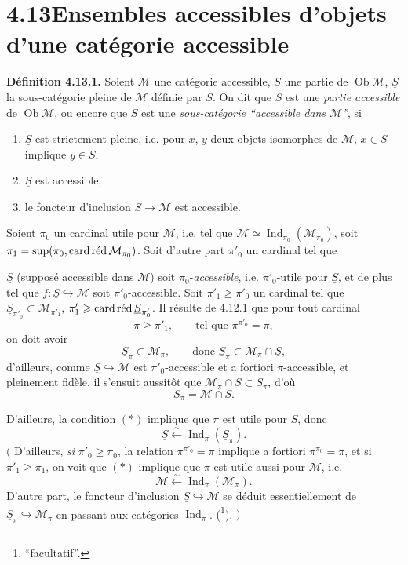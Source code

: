 \documentclass[11pt]{article}
\newcommand{\printedpage}[1]{\marginpar{\footnotesize p.~#1}}
\newcommand{\msp}[1]{\marginpar{\footnotesize [#1]}}
\newcommand{\M}{\mathcal{M}}
\newcommand{\Ind}{\operatorname{Ind}}
\newcommand{\Ob}{\operatorname{Ob}}
\newcommand{\card}{\operatorname{card}}
\newcommand{\red}{\mathop{\textup{réd}}\nolimits}
\newcommand{\uS}{\underline{S}}
\begin{document}
\msp{page 281}

\section*{4.13\quad Ensembles accessibles d'objets d'une catégorie accessible}

\textbf{Définition 4.13.1.} Soient $\M$ une catégorie accessible, $S$ une partie de $\Ob\M$, $\uS$ la sous-catégorie pleine de $\M$ définie par $S$. On dit que $S$ est une \textit{partie accessible} de $\Ob\M$, ou encore que $\uS$ est une \textit{sous-catégorie “accessible dans $\M$”}, si
\printedpage{105}
\begin{enumerate}
\item[a)] $\uS$ est strictement pleine, i.e. pour $x$, $y$ deux objets isomorphes de $\M$, $x \in S$ implique $y \in S$,
\item[b)] $\uS$ est accessible,
\item[c)] le foncteur d'inclusion $\uS \longrightarrow \M$ est accessible.
\end{enumerate}
Soient $\pi_0$ un cardinal utile pour $\M$, i.e. tel que $\M \simeq \Ind_{\pi_0}(\M_{\pi_0})$, soit $\pi_1 = \sup(\pi_0, \card\red\M_{\pi_0})$. Soit d'autre part $\pi'_0$ un cardinal tel que

\msp{page 282}
$\uS$ (supposé accessible dans $\M$) soit $\pi_0$-\textit{accessible}, i.e. $\pi'_0$-utile pour $\uS$, et de plus tel %
que $f : \uS \hookrightarrow \M$ soit $\pi'_0$-accessible. Soit $\pi'_1 \geqslant \pi'_0$ un cardinal tel que $\uS_{\pi'_0} \subset \M_{\pi'_1}$, $\pi'_1 \geqslant \card\red\uS_{\pi'_0}$. Il résulte de 4.12.1 que pour tout cardinal
\[
\pi \geqslant \pi'_1 , \qquad \text{tel que } \pi^{\pi'_0} = \pi, \tag*{$(*)$}
\]
on doit avoir
\[
\uS_\pi \subset \M_\pi , \qquad \text{donc } \uS_\pi \subset \M_\pi \cap \uS,
\]
d'ailleurs, comme $\uS \hookrightarrow \M$ est $\pi'_0$-accessible et a fortiori $\pi$-accessible, et pleinement fidèle, il s'ensuit aussitôt que $\M_\pi \cap S \subset S_\pi$, d'où
\[
S_\pi = \M \cap S . %
\]

\msp{page 283}
D'ailleurs, la condition $(*)$ implique que $\pi$ est utile pour $\uS$, donc
\[
\uS \xleftarrow{\sim} \Ind_\pi(\uS_\pi) .
\]
$\Big($ D'ailleurs, \textit{si} $\pi'_0 \geqslant \pi_0$, la relation $\pi^{\pi'_0} = \pi$ implique a fortiori $\pi^{\pi_0} = \pi$, et si $\pi'_1 \geqslant \pi_1$, on voit que $(*)$ implique que $\pi$ est utile aussi pour $\M$, i.e.
\[
\M \xleftarrow{\sim} \Ind_\pi(\M_\pi) .
\]
D'autre part, le foncteur d'inclusion $\uS \hookrightarrow \M$ se déduit essentiellement de $\uS_\pi \hookrightarrow \M_\pi$ en passant aux catégories $\Ind_\pi$. (\footnote[116]{ “facultatif”.}). $\Big)$
\end{document}
